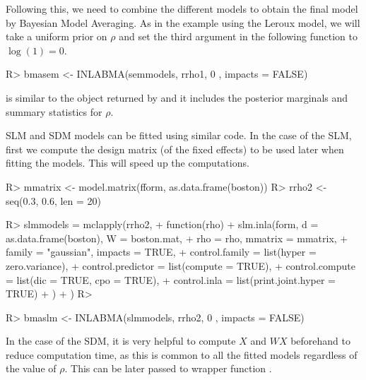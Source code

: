 \documentclass[article]{jss}
\begin{document}
\noindent
Following this, we need to combine the different models
to obtain the final model by Bayesian Model Averaging. As in the
example using the Leroux model, we will take
a uniform prior on $\rho$ and set the third argument in the following
function to $\log(1)=0$. 

\begin{Schunk}
\begin{Sinput}
R> bmasem <- INLABMA(semmodels, rrho1, 0 , impacts = FALSE)
\end{Sinput}
\end{Schunk}

 is similar to the object returned by  and it
includes the posterior marginals and summary statistics for $\rho$.

SLM and SDM models can be fitted using similar code. In the case of
the SLM, first we compute the design matrix (of the fixed effects) 
to be used later when fitting the models. This will speed up the 
computations.

\begin{Schunk}
\begin{Sinput}
R> mmatrix <- model.matrix(fform, as.data.frame(boston))
R> rrho2 <- seq(0.3, 0.6, len = 20)
\end{Sinput}
\end{Schunk}

\begin{Schunk}
\begin{Sinput}
R> slmmodels = mclapply(rrho2,
+          function(rho) {
+                  slm.inla(form, d = as.data.frame(boston), W = boston.mat, 
+  			rho = rho, mmatrix = mmatrix,
+                          family = "gaussian", impacts = TRUE,
+                          control.family = list(hyper = zero.variance),
+                          control.predictor = list(compute = TRUE),
+                          control.compute = list(dic = TRUE, cpo = TRUE),
+                          control.inla = list(print.joint.hyper = TRUE)
+                  )
+          })
R> 
\end{Sinput}
\end{Schunk}

\begin{Schunk}
\begin{Sinput}
R> bmaslm <- INLABMA(slmmodels, rrho2, 0 , impacts = FALSE)
\end{Sinput}
\end{Schunk}

In the case of the SDM, it is very helpful to compute $X$ and $WX$ beforehand
to reduce computation time, as this is common to all the fitted models
regardless of the value of $\rho$. This can be later passed to wrapper function
.
\end{document}
